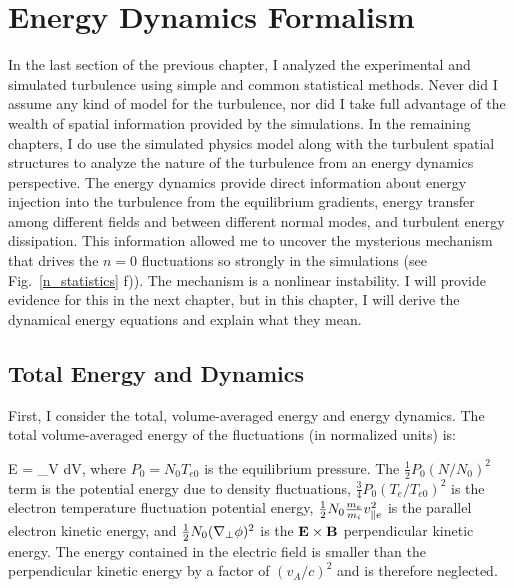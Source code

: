 \chapter{Energy Dynamics Formalism}
\label{c_en_formalism}

In the last section of the previous chapter, I analyzed the experimental and simulated turbulence using simple and common statistical methods. Never did I assume any kind of model for the turbulence,
nor did I take full advantage of the wealth of spatial information provided by the simulations. In the remaining chapters, I do use the simulated physics model along with the turbulent spatial
structures to analyze the nature of the turbulence from an energy dynamics perspective. The energy dynamics provide direct information about energy injection into the turbulence from the equilibrium
gradients, energy transfer among different fields and between different normal modes, and turbulent energy dissipation. This information allowed me to uncover the mysterious mechanism that
drives the $n=0$ fluctuations so strongly in the simulations (see Fig.~\ref{n_statistics} f)). The mechanism is a nonlinear instability. I will provide evidence
for this in the next chapter, but in this chapter, I will derive the dynamical energy equations and explain what they mean.

\section{Total Energy and Dynamics}
\label{s_tot_en_dyn}

First, I consider the total, volume-averaged energy and energy dynamics. The total volume-averaged energy of the fluctuations (in normalized units) is:

\beq
\label{tot_energy}
E =  \int_V   dV,
\eeq
where $P_0 = N_0 T_{e0}$ is the equilibrium pressure.
The $\frac{1}{2} P_0 (N/N_0)^2$ term is the potential energy due to density fluctuations, $\frac{3}{4} P_0 (T_e/T_{e0})^2$ is the electron temperature fluctuation potential energy,
$\frac{1}{2} N_0 \frac{m_e}{m_i} v_{\parallel e}^2$ is the parallel electron kinetic energy, and $\frac{1}{2} N_0 (\nabla_\perp \phi)^2$ is the ${\bf E \times B}$ perpendicular kinetic energy.
The energy contained in the electric field is smaller than the perpendicular kinetic energy by a factor of $(v_A/c)^2$ and is therefore neglected.

